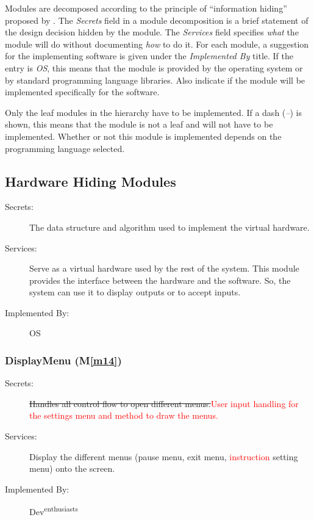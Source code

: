 \documentclass[12pt, titlepage]{article}
\newcommand{\mref}[1]{M\ref{#1}}
\begin{document}
Modules are decomposed according to the principle of ``information hiding''
proposed by \citet{ParnasEtAl1984}. The \emph{Secrets} field in a module
decomposition is a brief statement of the design decision hidden by the
module. The \emph{Services} field specifies \emph{what} the module will do
without documenting \emph{how} to do it. For each module, a suggestion for the
implementing software is given under the \emph{Implemented By} title. If the
entry is \emph{OS}, this means that the module is provided by the operating
system or by standard programming language libraries.  Also indicate if the
module will be implemented specifically for the software.

Only the leaf modules in the
hierarchy have to be implemented. If a dash (\emph{--}) is shown, this means
that the module is not a leaf and will not have to be implemented. Whether or
not this module is implemented depends on the programming language
selected.

\subsection{Hardware Hiding Modules}
\begin{description}
\item[Secrets:]The data structure and algorithm used to implement the virtual
  hardware.
\item[Services:]Serve as a virtual hardware used by the rest of the
  system. This module provides the interface between the hardware and the
  software. So, the system can use it to display outputs or to accept inputs.
\item[Implemented By:] OS
\end{description}


\subsubsection{DisplayMenu (\mref{m14})}
\begin{description}
\item[Secrets:] \sout{Handles all control flow to open different menus.}\textcolor{red}{User input handling for the settings menu and method to draw the menus.} 
\item[Services:] Display the different menus (pause menu, exit menu, \textcolor{red}{instruction} setting menu) onto the screen.
\item[Implemented By:] Dev\textsuperscript{enthusiasts}
\end{description}
\end{document}
